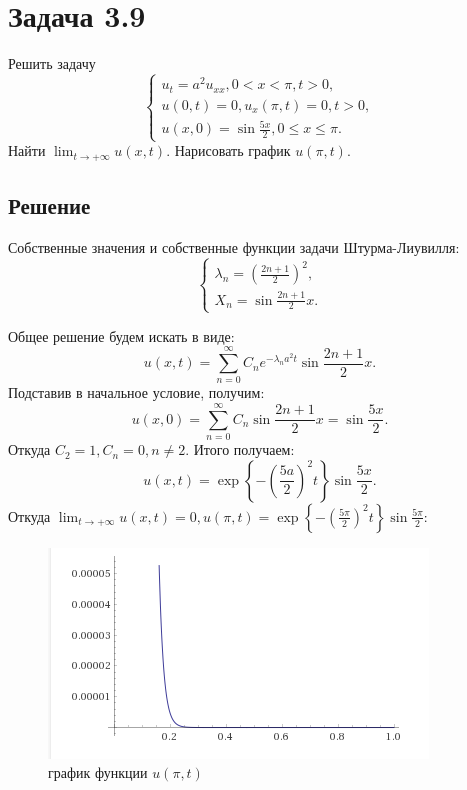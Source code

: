 \documentclass[11pt]{article}
\begin{document}
\section{Задача 3.9}
\label{sec:org5950be0}
Решить задачу
\begin{equation}
\begin{cases}
u_t = a^2u_{xx}, 0 < x < \pi, t > 0, \\
u(0, t) = 0, u_x(\pi, t) = 0, t > 0, \\
u(x, 0) = \sin\frac{5x}2, 0 \leq x \leq \pi.
\end{cases}
\end{equation}
Найти $\lim_{t \to +\infty}u(x, t)$. Нарисовать график $u(\pi, t)$.
\subsection{Решение}
\label{sec:orgaac21f5}
Собственные значения и собственные функции задачи Штурма-Лиувилля:
\begin{equation*}
\begin{cases}
\lambda_n = \left(\frac{2n + 1}2\right)^2, \\
X_n = \sin\frac{2n + 1}2x.
\end{cases}
\end{equation*}

Общее решение будем искать в виде:
\begin{equation*}
u(x, t) = \sum_{n = 0}^{\infty}C_ne^{-\lambda_na^2t}\sin\frac{2n + 1}2x.
\end{equation*}
Подставив в начальное условие, получим:
\begin{equation*}
u(x, 0) = \sum_{n = 0}^{\infty}C_n\sin\frac{2n + 1}2x = \sin\frac{5x}2.
\end{equation*}
Откуда $C_2 = 1, C_n = 0, n \neq 2$. Итого получаем:
\begin{equation}
u(x, t) = \exp\left\{-\left(\frac{5a}2\right)^2t\right\}\sin\frac{5x}2.
\end{equation}
Откуда $\lim_{t \to +\infty}u(x, t) = 0, u(\pi, t) = \exp\left\{-\left(\frac{5\pi}2\right)^2t\right\}\sin\frac{5\pi}2$:
\begin{figure}[htbp]
\centering
\includegraphics[width=.9\linewidth]{./img/image_2019-09-21_19-20-42.png}
\caption{график функции \(u(\pi, t)\)}
\end{figure}
\end{document}
